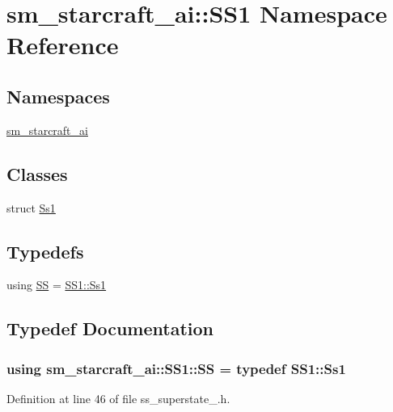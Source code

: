 \hypertarget{namespacesm__starcraft__ai_1_1SS1}{}\section{sm\+\_\+starcraft\+\_\+ai\+:\+:S\+S1 Namespace Reference}
\label{namespacesm__starcraft__ai_1_1SS1}
\subsection*{Namespaces}
\begin{DoxyCompactItemize}
\item 
 \hyperlink{namespacesm__starcraft__ai_1_1SS1_1_1sm__starcraft__ai}{sm\+\_\+starcraft\+\_\+ai}
\end{DoxyCompactItemize}
\subsection*{Classes}
\begin{DoxyCompactItemize}
\item 
struct \hyperlink{structsm__starcraft__ai_1_1SS1_1_1Ss1}{Ss1}
\end{DoxyCompactItemize}
\subsection*{Typedefs}
\begin{DoxyCompactItemize}
\item 
using \hyperlink{namespacesm__starcraft__ai_1_1SS1_a580e59c10aed7d3404c7c76e1d2e4f0e}{SS} = \hyperlink{structsm__starcraft__ai_1_1SS1_1_1Ss1}{S\+S1\+::\+Ss1}
\end{DoxyCompactItemize}


\subsection{Typedef Documentation}
\subsubsection[{\texorpdfstring{SS}{SS}}]{\setlength{\rightskip}{0pt plus 5cm}using {\bf sm\+\_\+starcraft\+\_\+ai\+::\+S\+S1\+::\+SS} = typedef {\bf S\+S1\+::\+Ss1}}\hypertarget{namespacesm__starcraft__ai_1_1SS1_a580e59c10aed7d3404c7c76e1d2e4f0e}{}\label{namespacesm__starcraft__ai_1_1SS1_a580e59c10aed7d3404c7c76e1d2e4f0e}


Definition at line 46 of file ss\+\_\+superstate\+\_.\+h.

